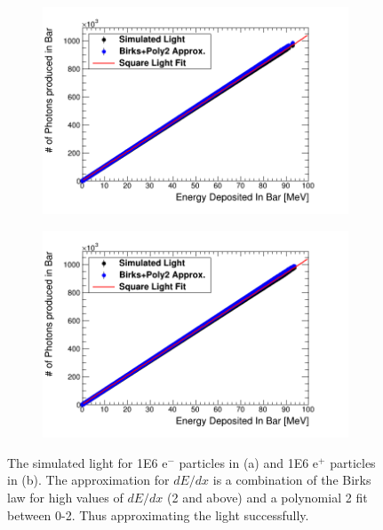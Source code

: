 \begin{figure}[htbp]
\centering
\begin{subfigure}{.5\textwidth}
  \centering
  \includegraphics[width=\linewidth]{Appendix5/newFigs/e-Birks-Poly2Slab_simAndApproxLight.png}
  \captionsetup{width=.9\linewidth}
  \caption{}
  \label{subfig:append5_light_of_electronsLin0-100mev}
\end{subfigure}%
\begin{subfigure}{.5\textwidth}
  \centering
  \includegraphics[width=\linewidth]{Appendix5/newFigs/e+Birks-Poly2Slab_simAndApproxLight.png}
  \captionsetup{width=.9\linewidth}
  \caption{}
  \label{subfig:append5_light_of_positronsLin0-100mev}
\end{subfigure}
\caption{The simulated light for 1E6 e$^-$ particles in (a) and 1E6 e$^+$ particles in (b). The approximation for $dE/dx$ is a combination of the Birks law for high values of $dE/dx$ (2 and above) and a polynomial 2 fit between 0-2. Thus approximating the light successfully.}
\label{fig:append5_light_of_electrons_positronsLin0-100mev}
\end{figure}